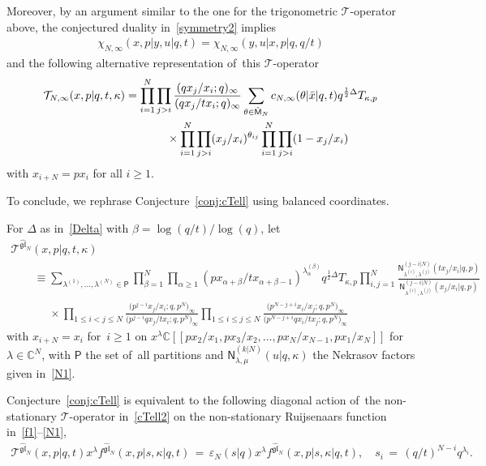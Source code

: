 \documentclass[pdftex]{sigma}%
\numberwithin{equation}{section}
\newcommand{\bx}{\bar{x}}
\newcommand{\C}{{\mathbb C}}
\newcommand{\cT}{{\mathcal T}}
\begin{document}
Moreover, by an argument similar to the one for the trigonometric $\cT$-operator above, the conjectured duality in~\eqref{symmetry2} implies
\begin{gather*}
\chi_{N,\infty}(x,p|y,u|q,t)=\chi_{N,\infty}(y,u|x,p|q,q/t)
\end{gather*}
and the following alternative representation of~this $\cT$-operator
\begin{gather*}
\cT_{N,\infty}(x,p|q,t,\kappa)
= \prod_{i=1}^N \prod_{j>i} \frac{(qx_j/x_i;q)_\infty}{(qx_j/tx_i;q)_\infty} \sum_{\theta\in\hat{\mathsf{M}}_N} c_{N,\infty}(\theta|\bx|q,t)
q^{\frac12\Delta} T_{\kappa,p}
\\ \hphantom{\cT_{N,\infty}(x,p|q,t,\kappa)= }
{}\times \prod_{i=1}^N\prod_{j>i}(x_j/x_i)^{\theta_{ij}}
 \prod_{i=1}^N \prod_{j>i}(1-x_j/x_i)
\end{gather*}
with $x_{i+N}=px_i$ for all $i\geq 1$.

To conclude, we rephrase Conjecture~\ref{conj:cTell} using balanced coordinates.

\begin{Definition}\label{def:cTellB}
For $\Delta$ as in~\eqref{Delta} with $\beta=\log(q/t)/\log(q)$, let
\begin{gather}
\cT^{\widehat{\mathfrak{gl}}_N}(x,p|q,t,\kappa)\nonumber
\\[-1ex] \qquad
{}\equiv \sum_{\lambda^{(1)},\dots,\lambda^{(N)}\in\mathsf{P}}
\prod_{\beta=1}^N\prod_{\alpha\geq 1}(p x_{\alpha+\beta}/tx_{\alpha+\beta-1})^{\lambda^{(\beta)}_\alpha} q^{\frac12\Delta}T_{\kappa,p}
\prod_{i,j=1}^N\frac{\mathsf{N}^{(j-i|N)}_{\lambda^{(i)},\lambda^{(j)}}
(tx_j/x_i|q,p)}{\mathsf{N}^{(j-i|N)}_{\lambda^{(i)},\lambda^{(j)}}(x_j/x_i|q,p)}\nonumber
\\ \qquad\phantom{\equiv}
{}\times\prod_{1\leq i<j\leq N} \frac{\big(p^{j-i}x_j/x_i;q,p^N\big)_\infty}{\big(p^{j-i}qx_j/tx_i;q,p^N\big)_\infty} \prod_{1\leq i\leq j\leq N} \frac{\big(p^{N-j+i}x_i/x_j;q,p^N\big)_\infty}{\big(p^{N-j+i}qx_i/tx_j;q,p^N\big)_\infty}\label{cTell2}
\end{gather}
with $x_{i+N}=x_i$ for~$i\geq 1$ on $x^\lambda \C[[px_2/x_1,px_3/x_2,\dots,px_{N}/x_{N-1},px_1/x_N]]$ for~$\lambda\in\C^N$, with $\mathsf{P}$ the set of~all partitions and $\mathsf{N}^{(k|N)}_{\lambda,\mu}(u|q,\kappa)$
the Nekrasov factors given in~\eqref{N1}.
\end{Definition}

\begin{Fact}\label{conj:cTellB}Conjecture~\ref{conj:cTell} is equivalent to the following diagonal action of~the non-stationary $\cT$-operator in~\eqref{cTell2} on the non-stationary Ruijsenaars function in~\eqref{f1}--\eqref{N1},
\begin{gather}
\label{cTBeq}
\cT^{\widehat{\mathfrak{gl}}_N}(x,p|q,t)x^\lambda f^{\widehat{\mathfrak{gl}}_N}(x,p|s,\kappa|q,t) \,{=}\,\varepsilon_N(s|q)x^\lambda f^{\widehat{\mathfrak{gl}}_N}(x,p|s,\kappa|q,t),\quad
s_i \,{=}\, (q/t)^{N-i} q^{\lambda_i}.
\end{gather}
\end{Fact}
\end{document}
